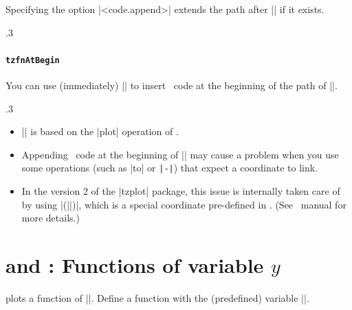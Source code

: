 Specifying the option |<code.append>| extends the path after |\tzfnEnd| if it exists.

\begin{tzcode}{.3}
\end{tzcode}


\paragraph{\texttt{\bs tzfnAtBegin}}
You can use \icmd{\tzfnAtBegin} (immediately)  |\tzfn| to insert \Tikz\ code at the beginning of the path of |\tzfn|.

\begin{tzcode}{.3}
\end{tzcode}




\remark
\begin{itemize}\firmlist
\item |\tzfn| is based on the |plot| operation of \Tikz.
\item Appending \Tikz\ code at the beginning of |\tzfn| may cause a problem when you use some operations (such as |to| or \verb+|-|+) that expect a coordinate to link.
\item In the version 2 of the |tzplot| package, this issue is internally taken care of by using
|(||)|, which is a special coordinate pre-defined in \Tikz. (See \Tikz\ manual for more details.)
\end{itemize}



\section{\protect\cmd{\tzfnofy} and \protect{}: Functions of variable $y$}
\label{ss:tzfnofy}

\icmd{\tzfnofy} plots a function of |\y|.
Define a function with the (predefined) variable |\y|.


